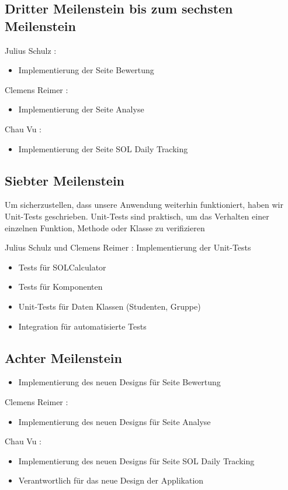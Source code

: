 \documentclass[
  a4paper,
  DIV=10,
  oneside,
  BCOR=5mm,
  parskip=half,
  numbers=noenddot
]{scrreprt}
\begin{document}
\subsection{Dritter Meilenstein bis zum sechsten Meilenstein}
Julius Schulz :
\begin{itemize}
  \item Implementierung der Seite Bewertung
\end{itemize}
Clemens Reimer : 
\begin{itemize}
  \item Implementierung der Seite Analyse 
\end{itemize}
Chau Vu :
\begin{itemize}
  \item Implementierung der Seite SOL Daily Tracking
\end{itemize}
\subsection{Siebter Meilenstein}
Um sicherzustellen, dass unsere Anwendung weiterhin funktioniert, haben wir Unit-Tests geschrieben. 
Unit-Tests sind praktisch, um das Verhalten einer einzelnen Funktion, Methode oder Klasse zu verifizieren

Julius Schulz und Clemens Reimer : Implementierung der Unit-Tests 
\begin{itemize}
  \item Tests für SOLCalculator
  \item Tests für Komponenten
  \item Unit-Tests für Daten Klassen (Studenten, Gruppe)
  \item Integration für automatisierte Tests
\end{itemize}
\subsection{Achter Meilenstein}
\begin{itemize}
  \item Implementierung des neuen Designs für Seite Bewertung
\end{itemize}
Clemens Reimer : 
\begin{itemize}
  \item Implementierung des neuen Designs für Seite Analyse  
\end{itemize}
Chau Vu :
\begin{itemize}
  \item Implementierung des neuen Designs für Seite SOL Daily Tracking
  \item Verantwortlich für das neue Design der Applikation 
\end{itemize}
\end{document}
